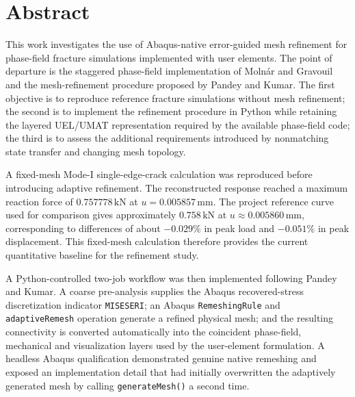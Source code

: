 \chapter*{Abstract}

This work investigates the use of Abaqus-native error-guided mesh refinement for phase-field fracture simulations implemented with user elements. The point of departure is the staggered phase-field implementation of Moln\'ar and Gravouil and the mesh-refinement procedure proposed by Pandey and Kumar. The first objective is to reproduce reference fracture simulations without mesh refinement; the second is to implement the refinement procedure in Python while retaining the layered UEL/UMAT representation required by the available phase-field code; the third is to assess the additional requirements introduced by nonmatching state transfer and changing mesh topology.

A fixed-mesh Mode-I single-edge-crack calculation was reproduced before introducing adaptive refinement. The reconstructed response reached a maximum reaction force of $0.757778\,\mathrm{kN}$ at $u=0.005857\,\mathrm{mm}$. The project reference curve used for comparison gives approximately $0.758\,\mathrm{kN}$ at $u\approx0.005860\,\mathrm{mm}$, corresponding to differences of about $-0.029\%$ in peak load and $-0.051\%$ in peak displacement. This fixed-mesh calculation therefore provides the current quantitative baseline for the refinement study.

A Python-controlled two-job workflow was then implemented following Pandey and Kumar. A coarse pre-analysis supplies the Abaqus recovered-stress discretization indicator \texttt{MISESERI}; an Abaqus \texttt{RemeshingRule} and \texttt{adaptiveRemesh} operation generate a refined physical mesh; and the resulting connectivity is converted automatically into the coincident phase-field, mechanical and visualization layers used by the user-element formulation. A headless Abaqus qualification demonstrated genuine native remeshing and exposed an implementation detail that had initially overwritten the adaptively generated mesh by calling \texttt{generateMesh()} a second time.

